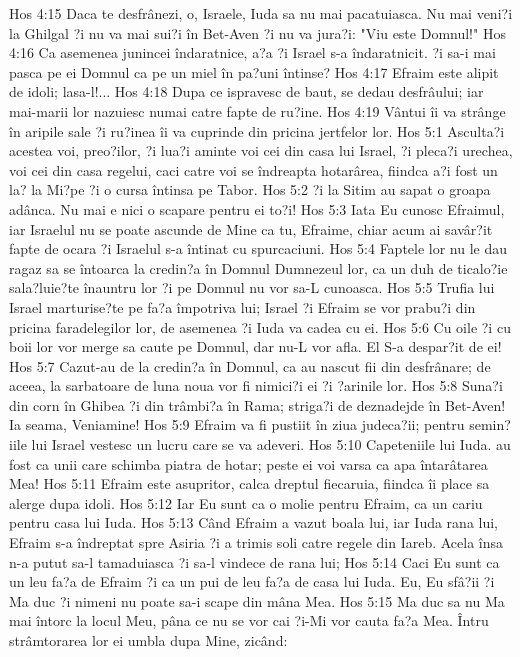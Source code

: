 Hos 4:15  Daca te desfrânezi, o, Israele, Iuda sa nu mai pacatuiasca. Nu mai veni?i la Ghilgal ?i nu va mai sui?i în Bet-Aven ?i nu va jura?i: "Viu este Domnul!"
Hos 4:16  Ca asemenea junincei îndaratnice, a?a ?i Israel s-a îndaratnicit. ?i sa-i mai pasca pe ei Domnul ca pe un miel în pa?uni întinse?
Hos 4:17  Efraim este alipit de idoli; lasa-l!...
Hos 4:18  Dupa ce ispravesc de baut, se dedau desfrâului; iar mai-marii lor nazuiesc numai catre fapte de ru?ine.
Hos 4:19  Vântui îi va strânge în aripile sale ?i ru?inea îi va cuprinde din pricina jertfelor lor.
Hos 5:1  Asculta?i acestea voi, preo?ilor, ?i lua?i aminte voi cei din casa lui Israel, ?i pleca?i urechea, voi cei din casa regelui, caci catre voi se îndreapta hotarârea, fiindca a?i fost un la? la Mi?pe ?i o cursa întinsa pe Tabor.
Hos 5:2  ?i la Sitim au sapat o groapa adânca. Nu mai e nici o scapare pentru ei to?i!
Hos 5:3  Iata Eu cunosc Efraimul, iar Israelul nu se poate ascunde de Mine ca tu, Efraime, chiar acum ai savâr?it fapte de ocara ?i Israelul s-a întinat cu spurcaciuni.
Hos 5:4  Faptele lor nu le dau ragaz sa se întoarca la credin?a în Domnul Dumnezeul lor, ca un duh de ticalo?ie sala?luie?te înauntru lor ?i pe Domnul nu vor sa-L cunoasca.
Hos 5:5  Trufia lui Israel marturise?te pe fa?a împotriva lui; Israel ?i Efraim se vor prabu?i din pricina faradelegilor lor, de asemenea ?i Iuda va cadea cu ei.
Hos 5:6  Cu oile ?i cu boii lor vor merge sa caute pe Domnul, dar nu-L vor afla. El S-a despar?it de ei!
Hos 5:7  Cazut-au de la credin?a în Domnul, ca au nascut fii din desfrânare; de aceea, la sarbatoare de luna noua vor fi nimici?i ei ?i ?arinile lor.
Hos 5:8  Suna?i din corn în Ghibea ?i din trâmbi?a în Rama; striga?i de deznadejde în Bet-Aven! Ia seama, Veniamine!
Hos 5:9  Efraim va fi pustiit în ziua judeca?ii; pentru semin?iile lui Israel vestesc un lucru care se va adeveri.
Hos 5:10  Capeteniile lui Iuda. au fost ca unii care schimba piatra de hotar; peste ei voi varsa ca apa întarâtarea Mea!
Hos 5:11  Efraim este asupritor, calca dreptul fiecaruia, fiindca îi place sa alerge dupa idoli.
Hos 5:12  Iar Eu sunt ca o molie pentru Efraim, ca un cariu pentru casa lui Iuda.
Hos 5:13  Când Efraim a vazut boala lui, iar Iuda rana lui, Efraim s-a îndreptat spre Asiria ?i a trimis soli catre regele din Iareb. Acela însa n-a putut sa-l tamaduiasca ?i sa-l vindece de rana lui;
Hos 5:14  Caci Eu sunt ca un leu fa?a de Efraim ?i ca un pui de leu fa?a de casa lui Iuda. Eu, Eu sfâ?ii ?i Ma duc ?i nimeni nu poate sa-i scape din mâna Mea.
Hos 5:15  Ma duc sa nu Ma mai întorc la locul Meu, pâna ce nu se vor cai ?i-Mi vor cauta fa?a Mea. Întru strâmtorarea lor ei umbla dupa Mine, zicând:
